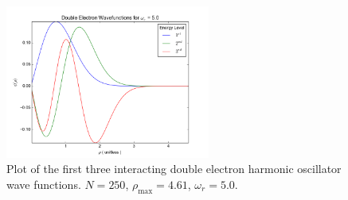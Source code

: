 \documentclass[a4paper,12pt]{report}
\begin{document}
\begin{figure}
\centering
 \includegraphics[width=0.6\textwidth]{DeHoWfWr5.png}
 \caption{Plot of the first three interacting double electron harmonic oscillator wave functions. $N = 250$, $\rho_{\mathrm{max}} = 4.61$, $\omega_r = 5.0$.}
 \label{fig:de5}
\end{figure}

\nocite{*}


\end{document}
